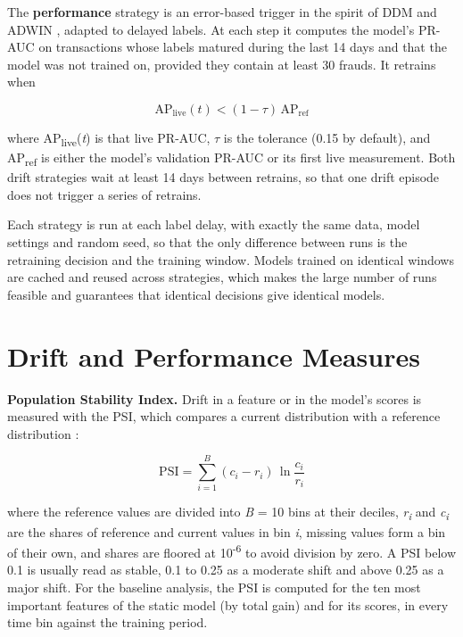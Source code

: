 The \textbf{performance} strategy is an error-based trigger in the spirit of DDM and ADWIN \cite{yelleti2025,aldaoud2025}, adapted to delayed labels. At each step it computes the model's PR-AUC on transactions whose labels matured during the last 14 days and that the model was not trained on, provided they contain at least 30 frauds. It retrains when

\begin{equation}
  \mathrm{AP}_{\mathrm{live}}(t) < (1 - \tau)\, \mathrm{AP}_{\mathrm{ref}}
  \label{eq:perftrigger}
\end{equation}

where AP\textsubscript{live}(\textit{t}) is that live PR-AUC, $\tau$ is the tolerance (0.15 by default), and AP\textsubscript{ref} is either the model's validation PR-AUC or its first live measurement. Both drift strategies wait at least 14 days between retrains, so that one drift episode does not trigger a series of retrains.

Each strategy is run at each label delay, with exactly the same data, model settings and random seed, so that the only difference between runs is the retraining decision and the training window. Models trained on identical windows are cached and reused across strategies, which makes the large number of runs feasible and guarantees that identical decisions give identical models.

\section{Drift and Performance Measures}

\textbf{Population Stability Index.} Drift in a feature or in the model's scores is measured with the PSI, which compares a current distribution with a reference distribution \cite{wong2025}:

\begin{equation}
  \mathrm{PSI} = \sum_{i=1}^{B} (c_i - r_i)\,\ln\frac{c_i}{r_i}
  \label{eq:psi}
\end{equation}

where the reference values are divided into \textit{B} = 10 bins at their deciles, \textit{r\textsubscript{i}} and \textit{c\textsubscript{i}} are the shares of reference and current values in bin \textit{i}, missing values form a bin of their own, and shares are floored at 10\textsuperscript{-6} to avoid division by zero. A PSI below 0.1 is usually read as stable, 0.1 to 0.25 as a moderate shift and above 0.25 as a major shift. For the baseline analysis, the PSI is computed for the ten most important features of the static model (by total gain) and for its scores, in every time bin against the training period.

